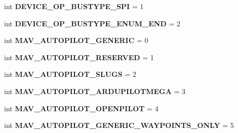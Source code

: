\begin{DoxyCompactItemize}
\mbox{\label{namespacepymavlink_1_1dialects_1_1v10_ac990483028c770051ed29faf8b5ddff5}} 
int {\bfseries D\+E\+V\+I\+C\+E\+\_\+\+O\+P\+\_\+\+B\+U\+S\+T\+Y\+P\+E\+\_\+\+S\+PI} = 1
\item 
\mbox{\label{namespacepymavlink_1_1dialects_1_1v10_a5db080c9eebfd520d69226ee9c833268}} 
int {\bfseries D\+E\+V\+I\+C\+E\+\_\+\+O\+P\+\_\+\+B\+U\+S\+T\+Y\+P\+E\+\_\+\+E\+N\+U\+M\+\_\+\+E\+ND} = 2
\item 
\mbox{\label{namespacepymavlink_1_1dialects_1_1v10_a25bdb0a0ad4eab0595e66d28768f3951}} 
int {\bfseries M\+A\+V\+\_\+\+A\+U\+T\+O\+P\+I\+L\+O\+T\+\_\+\+G\+E\+N\+E\+R\+IC} = 0
\item 
\mbox{\label{namespacepymavlink_1_1dialects_1_1v10_a6b6671259c94a815ad9d5ca45c6156bb}} 
int {\bfseries M\+A\+V\+\_\+\+A\+U\+T\+O\+P\+I\+L\+O\+T\+\_\+\+R\+E\+S\+E\+R\+V\+ED} = 1
\item 
\mbox{\label{namespacepymavlink_1_1dialects_1_1v10_ab610171458ed102bb70a0e41b55dff3d}} 
int {\bfseries M\+A\+V\+\_\+\+A\+U\+T\+O\+P\+I\+L\+O\+T\+\_\+\+S\+L\+U\+GS} = 2
\item 
\mbox{\label{namespacepymavlink_1_1dialects_1_1v10_aa18b64e0af95389f8c3b0f51102f6264}} 
int {\bfseries M\+A\+V\+\_\+\+A\+U\+T\+O\+P\+I\+L\+O\+T\+\_\+\+A\+R\+D\+U\+P\+I\+L\+O\+T\+M\+E\+GA} = 3
\item 
\mbox{\label{namespacepymavlink_1_1dialects_1_1v10_a3eac37764c52b37fe472999fbc0a6753}} 
int {\bfseries M\+A\+V\+\_\+\+A\+U\+T\+O\+P\+I\+L\+O\+T\+\_\+\+O\+P\+E\+N\+P\+I\+L\+OT} = 4
\item 
\mbox{\label{namespacepymavlink_1_1dialects_1_1v10_a7de8d456ec5a50bc71997b2e71d458f8}} 
int {\bfseries M\+A\+V\+\_\+\+A\+U\+T\+O\+P\+I\+L\+O\+T\+\_\+\+G\+E\+N\+E\+R\+I\+C\+\_\+\+W\+A\+Y\+P\+O\+I\+N\+T\+S\+\_\+\+O\+N\+LY} = 5
\item 
\mbox{\label{namespacepymavlink_1_1dialects_1_1v10_a9fbda942ddfe7a02153ca147f2a71168}} 

\end{DoxyCompactItemize}
